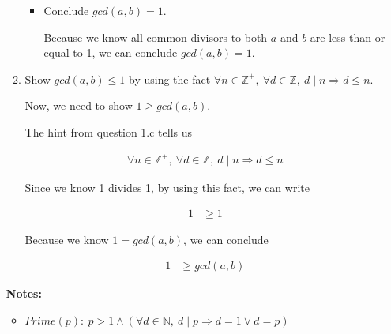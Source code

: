 \documentclass[12pt]{article}
\begin{document}
\begin{enumerate}[a.]
\begin{mdframed}
\begin{enumerate}[1.]
\begin{itemize}
\begin{mdframed}
                \end{mdframed}

                \item Conclude $gcd(a,b) = 1$.
                \begin{mdframed}

                Because we know all common divisors to both $a$ and $b$
                are less than or equal to 1, we can conclude $gcd(a,b) = 1$.

                \end{mdframed}
            \end{itemize}

            \item Show $gcd(a,b) \leq 1$ by using the fact $\forall n \in
            \mathbb{Z}^{+},\:\forall d \in \mathbb{Z},\:d \mid n \Rightarrow d \leq n$.

            \begin{mdframed}

            Now, we need to show $1 \geq gcd(a,b)$.

            \bigskip

            The hint from question 1.c tells us

            \begin{align}
                \forall n \in \mathbb{Z}^{+},\:\forall d \in \mathbb{Z},\:d \mid n \Rightarrow d \leq n
            \end{align}

            Since we know 1 divides 1, by using this fact, we can write

            \begin{align}
                1 &\geq 1
            \end{align}

            Because we know $1 = gcd(a,b)$, we can conclude

            \begin{align}
                1 &\geq gcd(a,b)
            \end{align}

            \end{mdframed}

        \end{enumerate}

    \end{mdframed}

    \bigskip

    \textbf{Notes:}

    \begin{itemize}
        \item $Prime(p):\:p > 1 \land (\forall d \in \mathbb{N},\:d \mid p \Rightarrow d = 1 \lor d = p)$
    \end{itemize}
\end{enumerate}
\end{document}
